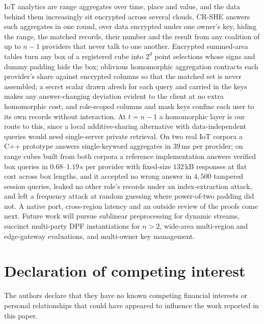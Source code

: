 \documentclass[a4paper,fleqn]{cas-sc}
\newif\ifanonymous
\begin{document}
IoT analytics are range aggregates over time, place and value, and the data
behind them increasingly sit encrypted across several clouds. CR-SHE answers
such aggregates in one round, over data encrypted under one owner's key,
hiding the range, the matched records, their number and the result from any
coalition of up to $n-1$ providers that never talk to one another. Encrypted
summed-area tables turn any box of a registered cube into $2^d$ point
selections whose signs and dummy padding hide the box; oblivious homomorphic
aggregation contracts each provider's share against encrypted columns so that
the matched set is never assembled; a secret scalar drawn afresh for each query
and carried in the keys makes any answer-changing deviation evident to the
client at no extra homomorphic cost; and role-scoped columns and mask keys
confine each user to its own records without interaction. At $t=n-1$ a
homomorphic layer is our route to this, since a local additive-sharing
alternative with data-independent queries would need single-server private
retrieval. On two real IoT corpora a C++ prototype answers single-keyword
aggregates in $39$\,ms per provider; on range cubes built from both corpora a
reference implementation answers verified box queries in $0.68$--$1.19$\,s
per provider with fixed-size $132$\,kB responses at flat cost across box
lengths, and it accepted no wrong answer in $4{,}500$ tampered session
queries, leaked no other role's records under an index-extraction attack, and
left a frequency attack at random guessing where power-of-two padding did not.
A native port, cross-region latency and an outside review of the proofs come
next.
Future work will pursue sublinear preprocessing for dynamic streams,
succinct multi-party DPF instantiations for $n>2$, wide-area multi-region and
edge-gateway evaluations, and multi-owner key management.

\ifanonymous\else\printcredits\fi

\section*{Declaration of competing interest}
The authors declare that they have no known competing financial interests or
personal relationships that could have appeared to influence the work reported
in this paper.
\end{document}
